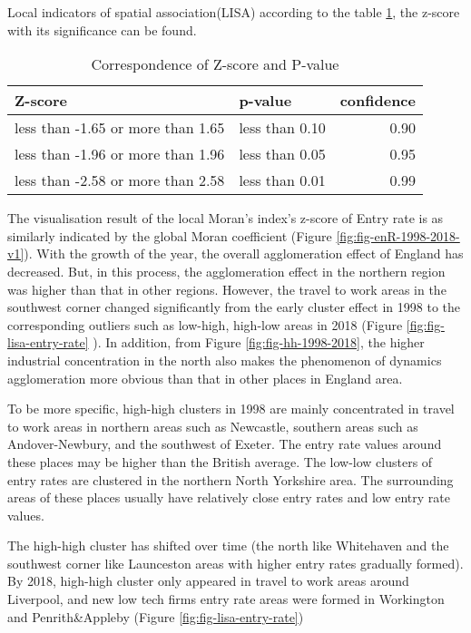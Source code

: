 \documentclass[
  12pt,
  oneside]{book}
\begin{document}
Local indicators of spatial association(LISA)
according to the table \ref{tab:tab-z-p-corr}, the z-score with its significance can be found.

\begin{table}

\caption{\label{tab:tab-z-p-corr}Correspondence of Z-score and P-value}
\centering
\begin{tabular}[t]{llr}
\toprule
\textbf{Z-score} & \textbf{p-value} & \textbf{confidence}\\
\midrule
less than -1.65 or more than 1.65 & less than 0.10 & 0.90\\
less than -1.96 or more than 1.96 & less than 0.05 & 0.95\\
less than -2.58 or more than 2.58 & less than 0.01 & 0.99\\
\bottomrule
\end{tabular}
\end{table}

The visualisation result of the local Moran's index's z-score of Entry rate is as similarly indicated by the global Moran coefficient (Figure \ref{fig:fig-enR-1998-2018-v1}). With the growth of the year, the overall agglomeration effect of England has decreased. But, in this process, the agglomeration effect in the northern region was higher than that in other regions. However, the travel to work areas in the southwest corner changed significantly from the early cluster effect in 1998 to the corresponding outliers such as low-high, high-low areas in 2018 (Figure \ref{fig:fig-lisa-entry-rate} ). In addition, from Figure \ref{fig:fig-hh-1998-2018}, the higher industrial concentration in the north also makes the phenomenon of dynamics agglomeration more obvious than that in other places in England area.

To be more specific, high-high clusters in 1998 are mainly concentrated in travel to work areas in northern areas such as Newcastle, southern areas such as Andover-Newbury, and the southwest of Exeter. The entry rate values around these places may be higher than the British average. The low-low clusters of entry rates are clustered in the northern North Yorkshire area. The surrounding areas of these places usually have relatively close entry rates and low entry rate values.

The high-high cluster has shifted over time (the north like Whitehaven and the southwest corner like Launceston areas with higher entry rates gradually formed). By 2018, high-high cluster only appeared in travel to work areas around Liverpool, and new low tech firms entry rate areas were formed in Workington and Penrith\&Appleby (Figure \ref{fig:fig-lisa-entry-rate})
\end{document}
